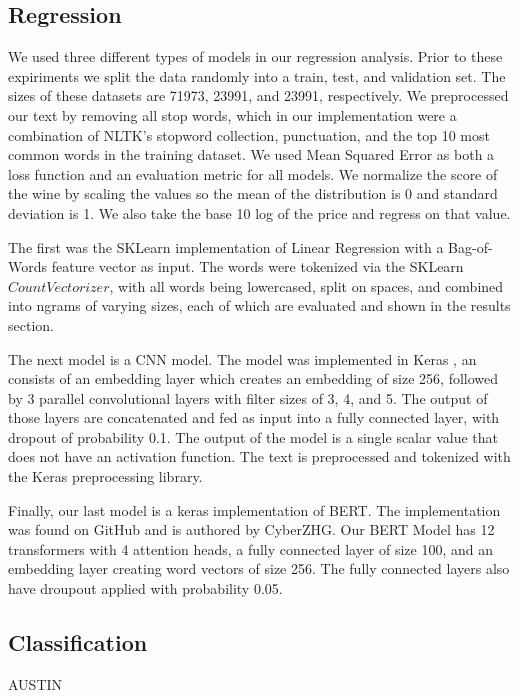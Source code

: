 \documentclass[10pt]{IEEEtran}
\begin{document}
\subsection{Regression}
    We used three different types of models in our regression analysis. Prior to these expiriments we split the data randomly into a train, test, and validation set. The sizes of these datasets are 71973, 23991, and 23991, respectively. We preprocessed our text by removing all stop words, which in our implementation were a combination of NLTK's stopword collection, punctuation, and the top 10 most common words in the training dataset. We used Mean Squared Error as both a loss function and an evaluation metric for all models. We normalize the score of the wine by scaling the values so the mean of the distribution is 0 and standard deviation is 1. We also take the base 10 log of the price and regress on that value. \par
    The first was the SKLearn implementation of Linear Regression with a Bag-of-Words feature vector as input. The words were tokenized via the SKLearn $CountVectorizer$, with all words being lowercased, split on spaces, and combined into ngrams of varying sizes, each of which are evaluated and shown in the results section. \par
    The next model is a CNN model. The model was implemented in Keras \cite{keras}, an consists of an embedding layer which creates an embedding of size 256, followed by 3 parallel convolutional layers with filter sizes of 3, 4, and 5. The output of those layers are concatenated and fed as input into a fully connected layer, with dropout of probability 0.1. The output of the model is a single scalar value that does not have an activation function. The text is preprocessed and tokenized with the Keras preprocessing library. \par
    Finally, our last model is a keras implementation of BERT. The implementation was found on GitHub and is authored by CyberZHG\cite{keras_bert}. Our BERT Model has 12 transformers with 4 attention heads, a fully connected layer of size 100, and an embedding layer creating word vectors of size 256. The fully connected layers also have droupout applied with probability 0.05.

\subsection{Classification}
AUSTIN
\end{document}
